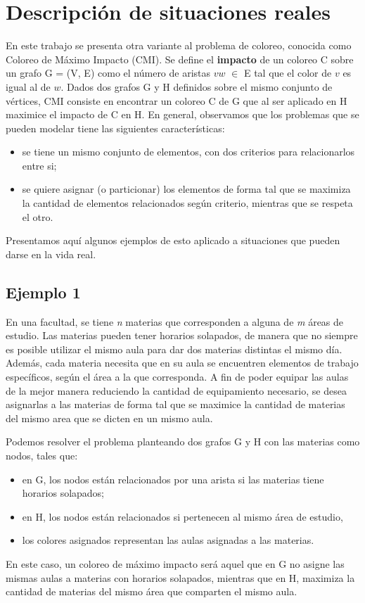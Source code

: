 \section{Descripción de situaciones reales}
En este trabajo se presenta otra variante al problema de coloreo, conocida como Coloreo de M\'aximo Impacto (CMI).
Se define el \textbf{impacto} de un coloreo C sobre un grafo G = (V, E) como el n\'umero de aristas $vw$ $\in $ E tal que el color de $v$ es igual al de $w$.
Dados dos grafos G y H definidos sobre el mismo conjunto de v\'ertices, CMI consiste en encontrar un coloreo C de G que al ser aplicado en H maximice el impacto de C en H. 
En general, observamos que los problemas que se pueden modelar tiene las siguientes caracter\'isticas:
\begin{itemize}
	\item se tiene un mismo conjunto de elementos, con dos criterios para relacionarlos entre si;
	\item se quiere asignar (o particionar) los elementos de forma tal que se maximiza la cantidad de elementos relacionados seg\'un criterio, mientras que se respeta el otro.
\end{itemize}
	
Presentamos aqu\'i algunos ejemplos de esto aplicado a situaciones que pueden darse en la vida real.


\subsection{Ejemplo 1}
En una facultad, se tiene \textsl{n} materias que corresponden a alguna de \textsl{m} \'areas de estudio.
Las materias pueden tener horarios solapados, de manera que no siempre es posible utilizar el mismo aula para dar dos materias distintas el mismo d\'ia.
Adem\'as, cada materia necesita que en su aula se encuentren elementos de trabajo espec\'ificos, seg\'un el \'area a la que corresponda. 
A fin de poder equipar las aulas de la mejor manera reduciendo la cantidad de equipamiento necesario, se desea asignarlas a las materias de forma tal que se maximice la cantidad de materias del mismo area que se dicten en un mismo aula.

Podemos resolver el problema planteando dos grafos G y H con las materias como nodos, tales que:
\begin{itemize}
	\item en G, los nodos est\'an relacionados por una arista si las materias tiene horarios solapados;
	\item en H, los nodos est\'an relacionados si pertenecen al mismo \'area de estudio,  
	\item los colores asignados representan las aulas asignadas a las materias.
\end{itemize}
En este caso, un coloreo de m\'aximo impacto ser\'a aquel que en G no asigne las mismas aulas a materias con horarios solapados, mientras que en H, maximiza la cantidad de materias del mismo \'area que comparten el mismo aula.

